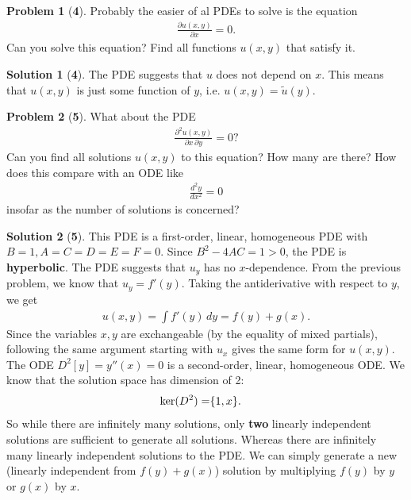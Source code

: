 \documentclass{book}
\theoremstyle{definition}
\newtheorem*{prob*}{Problem}
\newtheorem*{sln*}{Solution}
\begin{document}
\begin{prob*}[\textbf{4}]
	Probably the easier of al PDEs to solve is the equation
	\begin{align*}
	\frac{\partial u(x,y)}{\partial x} = 0.
	\end{align*}
	Can you solve this equation? Find all functions $u(x,y)$ that satisfy it.
	\begin{sln*}[\textbf{4}]
		The PDE suggests that $u$ does not depend on $x$. This means that $u(x,y)$ is just some function of $y$, i.e. $u(x,y) = \tilde{u}(y)$. 
	\end{sln*}
\end{prob*}

\begin{prob*}[\textbf{5}]
	What about the PDE
	\begin{align*}
	\frac{\partial^2 u(x,y)}{\partial x\,\partial y} = 0?
	\end{align*}
	Can you find all solutions $u(x,y)$ to this equation? How many are there? How does this compare with an ODE like
	\begin{align*}
	\frac{d^2 y}{d x^2} = 0
	\end{align*}
	insofar as the number of solutions is concerned?
	\begin{sln*}[\textbf{5}]
		This PDE is a first-order, linear, homogeneous PDE with $B = 1, A=C=D=E=F=0$. Since $B^2 - 4AC = 1 > 0$, the PDE is \textbf{hyperbolic}. The PDE suggests that $u_y$ has no $x$-dependence. From the previous problem, we know that $u_y = f'(y)$. Taking the antiderivative with respect to $y$, we get
		\begin{align*}
		\boxed{u(x,y) = \int f'(y)\,dy = f(y) + g(x)}.
		\end{align*} 
		Since the variables $x,y$ are exchangeable (by the equality of mixed partials), following the same argument starting with $u_x$ gives the same form for $u(x,y)$.\\
		
		\noindent The ODE $D^2[y] = y''(x) = 0$ is a second-order, linear, homogeneous ODE. We know that the solution space has dimension of 2:
		\begin{align*}
		\ker(D^2) = \span \{ 1, x \}.
		\end{align*} 
		So while there are infinitely many solutions, only \textbf{two} linearly independent solutions are sufficient to generate all solutions. Whereas there are infinitely many linearly independent solutions to the PDE. We can simply generate a new (linearly independent from $f(y) + g(x)$) solution by multiplying $f(y)$ by $y$ or $g(x)$ by $x$. 
	\end{sln*}
\end{prob*}
\end{document}
